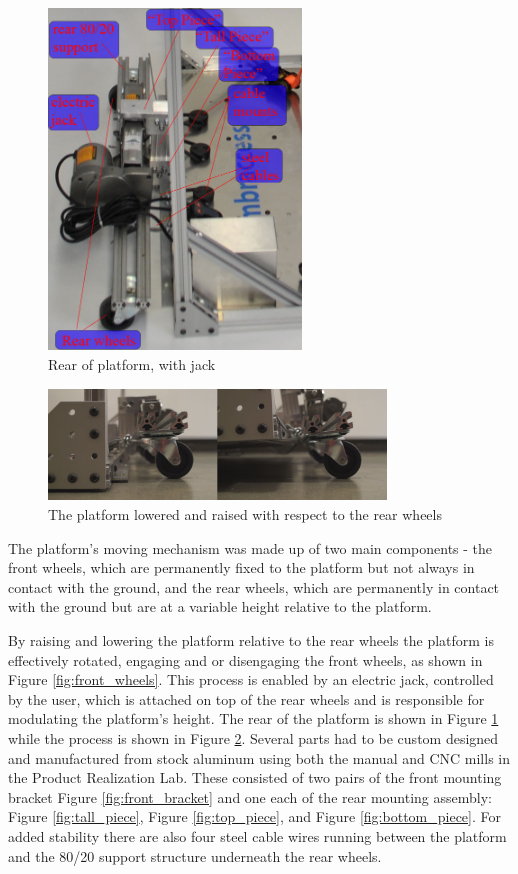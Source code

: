 \begin{figure}
\centering
 \includegraphics[width=0.6\textwidth]{images/rear_assembly}
\caption{Rear of platform, with jack}
\label{fig:rear_assembly}
\end{figure}

\begin{figure}
\centering
 \includegraphics[width=0.8\textwidth]{images/rear_raise}
\caption{The platform lowered and raised with respect to the rear wheels}
\label{fig:rear_raise}
\end{figure}

The platform's moving mechanism was made up of two main components - the front wheels, which are permanently fixed to the platform but not always in contact with the ground, and the rear wheels, which are permanently in contact with the ground but are at a variable height relative to the platform.

By raising and lowering the platform relative to the rear wheels the platform is effectively rotated, engaging and or disengaging the front wheels, as shown in Figure \ref{fig:front_wheels}. This process is enabled by an electric jack, controlled by the user, which is attached on top of the rear wheels and is responsible for modulating the platform's height. The rear of the platform is shown in Figure \ref{fig:rear_assembly} while the process is shown in Figure \ref{fig:rear_raise}. Several parts had to be custom designed and manufactured from stock aluminum using both the manual and CNC mills in the Product Realization Lab. These consisted of two pairs of the front mounting bracket Figure \ref{fig:front_bracket} and one each of the rear mounting assembly: Figure \ref{fig:tall_piece}, Figure \ref{fig:top_piece}, and Figure \ref{fig:bottom_piece}. For added stability there are also four steel cable wires running between the platform and the 80/20 support structure underneath the rear wheels.

